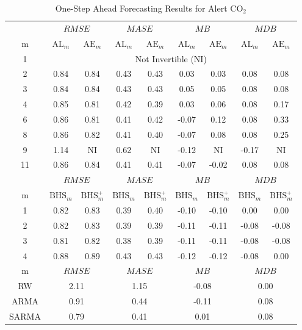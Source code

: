 \begin{table}[ht!]
\footnotesize
\centering
\caption{One-Step Ahead Forecasting Results for Alert $\textrm{CO}_2$}
\begin{tabular}{c|cc|cc|cc|cc}
  \hline
   & \multicolumn{2}{c|}{$RMSE$} & \multicolumn{2}{c|}{$MASE$} &
  \multicolumn{2}{c|}{$MB$} & \multicolumn{2}{c}{$MDB$}\\
   m & $\textrm{AL}_m$ & $\textrm{AE}_m$ &
  $\textrm{AL}_m$ & $\textrm{AE}_m$ &
  $\textrm{AL}_m$ & $\textrm{AE}_m$ &
  $\textrm{AL}_m$ & $\textrm{AE}_m$ \\
  \hline
  1 & \multicolumn{8}{c}{Not Invertible (NI)} \\ 
  2 & 0.84 & 0.84 & 0.43 & 0.43 & 0.03 & 0.03 & 0.08 & 0.08 \\ 
  3 & 0.84 & 0.84 & 0.43 & 0.43 & 0.05 & 0.05 & 0.08 & 0.08 \\ 
  4 & 0.85 & 0.81 & 0.42 & 0.39 & 0.03 & 0.06 & 0.08 & 0.17 \\ 
  6 & 0.86 & 0.81 & 0.41 & 0.42 & -0.07 & 0.12 & 0.08 & 0.33 \\ 
  8 & 0.86 & 0.82 & 0.41 & 0.40 & -0.07 & 0.08 & 0.08 & 0.25 \\ 
  9 & 1.14 & NI & 0.62 & NI & -0.12 & NI & -0.17 & NI \\ 
  11 & 0.86 & 0.84 & 0.41 & 0.41 & -0.07 & -0.02 & 0.08 & 0.08 \\ 
    \hline
  \hline
     & \multicolumn{2}{c|}{$RMSE$} & \multicolumn{2}{c|}{$MASE$} &
  \multicolumn{2}{c|}{$MB$} & \multicolumn{2}{c}{$MDB$}\\
  m & $\textrm{BHS}_m$ & $\textrm{BHS}^+_m$ &
  $\textrm{BHS}_m$ & $\textrm{BHS}^+_m$ &
  $\textrm{BHS}_m$ & $\textrm{BHS}^+_m$ &
  $\textrm{BHS}_m$ & $\textrm{BHS}^+_m$ \\
  \hline
  1 & 0.82 & 0.83 & 0.39 & 0.40 & -0.10 & -0.10 & 0.00 & 0.00 \\ 
  2 & 0.82 & 0.83 & 0.39 & 0.39 & -0.11 & -0.11 & -0.08 & -0.08 \\ 
  3 & 0.81 & 0.82 & 0.38 & 0.39 & -0.11 & -0.11 & -0.08 & -0.08 \\ 
  4 & 0.88 & 0.89 & 0.43 & 0.43 & -0.12 & -0.12 & -0.08 & 0.00 \\ 
  \hline
  \hline
      m & \multicolumn{2}{c|}{$RMSE$} & \multicolumn{2}{c|}{$MASE$} &
  \multicolumn{2}{c|}{$MB$} & \multicolumn{2}{c}{$MDB$}\\
  \hline
    RW &  \multicolumn{2}{c|}{2.11} & \multicolumn{2}{c|}{1.15} &
  \multicolumn{2}{c|}{-0.08} & \multicolumn{2}{c}{0.00}\\
      ARMA &  \multicolumn{2}{c|}{0.91} & \multicolumn{2}{c|}{0.44} &
  \multicolumn{2}{c|}{-0.11} & \multicolumn{2}{c}{0.08}\\
    SARMA &  \multicolumn{2}{c|}{0.79} & \multicolumn{2}{c|}{0.41} &
  \multicolumn{2}{c|}{0.01} & \multicolumn{2}{c}{0.08}\\
   \hline
\end{tabular}
\label{tab:alertselect}
\end{table}

